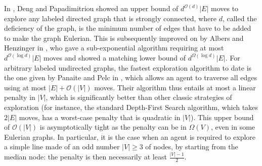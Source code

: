 \documentclass[11pt]{article}
\begin{document}
In \cite{DengP99}, Deng and Papadimitriou showed an upper bound of
$d^{\mathcal{O}(d)}|E|$ moves to explore any labeled directed graph
that is strongly connected, where $d$, called the deficiency of the graph, is the minimum number of edges
that have to be added to make the graph Eulerian. This is subsequently
improved on by Albers and Henzinger in \cite{AlbersH00}, who gave a
sub-exponential algorithm requiring at most $d^{\mathcal{O}(\log
  d)}|E|$ moves and showed a matching lower bound of $d^{\Omega(\log
  d)}|E|$. For arbitrary labeled undirected graphs, the fastest
exploration algorithm to date is the one given by Panaite and Pelc in
\cite{PanaiteP99}, which allows an agent to traverse all edges using
at most $|E|+\mathcal{O}(|V|)$ moves. Their algorithm thus entails at
most a linear penalty in $|V|$, which is
significantly better than other classic strategies of exploration (for
instance, the standard Depth-First Search algorithm, which takes
$2|E|$ moves, has a worst-case penalty that is quadratic in
$|V|$). This upper bound of $\mathcal{O}(|V|)$ is asymptotically tight 
as the penalty can be in $\Omega(V)$, even in some Eulerian graphs. In particular, it is the case when an agent is required to explore a simple line made of an odd number $|V|\geq 3$ of nodes, by starting from the median node: the penalty is then necessarily at least $\frac{|V|-1}{2}$. 
\end{document}
